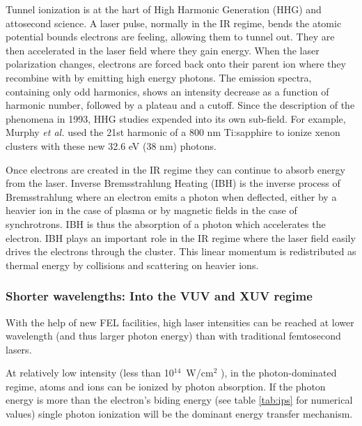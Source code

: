 Tunnel ionization is at the hart of High Harmonic Generation (HHG) and
attosecond science\cite{Fennel2010}. A laser pulse, normally in the IR regime,
bends the atomic potential bounds electrons are feeling, allowing them to tunnel
out. They are then accelerated in the laser field where they gain energy. When
the laser polarization changes, electrons are forced back onto their parent ion
where they recombine with by emitting high energy photons. The emission spectra,
containing only odd harmonics, shows an intensity decrease as a function of
harmonic number, followed by a plateau and a cutoff. Since the description
of the phenomena in 1993\cite{Corkum1993}, HHG studies expended into its own
sub-field. For example, Murphy \textit{et al.} used the 21st harmonic of a
800 nm Ti:sapphire to ionize xenon clusters\cite{Murphy2008a,Murphy2008b}
with these new 32.6 eV (38 nm) photons.


Once electrons are created in the IR regime they can continue to absorb energy
from the laser.
Inverse Bremsstrahlung Heating (IBH) is the inverse process of Bremsstrahlung
where an electron emits a photon when deflected, either by a heavier ion in the
case of plasma or by magnetic fields in the case of synchrotrons. IBH is thus
the absorption of a photon which accelerates the electron.
IBH plays an important role in the IR regime where the laser field easily
drives the electrons through the cluster\cite{Fennel2010}. This linear momentum
is redistributed as thermal energy by collisions and scattering on heavier ions.


\subsubsection{Shorter wavelengths: Into the VUV and XUV regime}
\label{section:intro:mechanisms:vuv}

With the help of new FEL facilities, high laser intensities can be reached at
lower wavelength (and thus larger photon energy) than with traditional
femtosecond lasers.

At relatively low intensity (less than 10$^{14}$~W/cm$^2$
\cite{Ramunno2008}), in the photon-dominated regime, atoms and ions
can be ionized by photon absorption. If the photon energy is more than the
electron's biding energy (see table \ref{tab:ips} for numerical values) single
photon ionization will be the dominant energy transfer mechanism.

